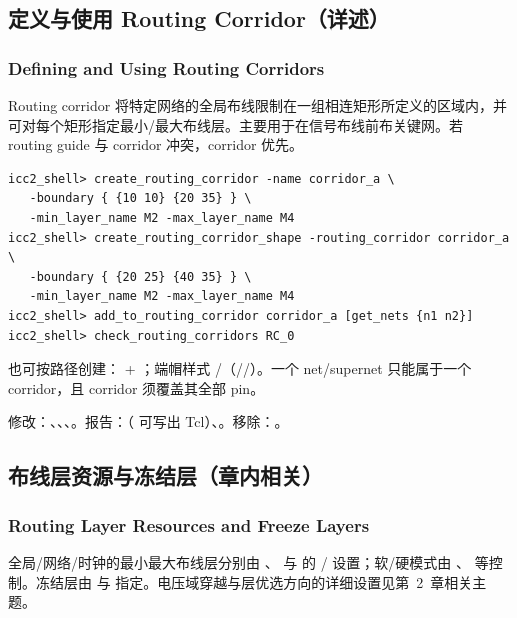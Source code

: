 
\subsection{定义与使用 Routing Corridor（详述）}
\subsubsection*{Defining and Using Routing Corridors}

Routing corridor 将特定网络的全局布线限制在一组相连矩形所定义的区域内，并可对每个矩形指定最小/最大布线层。主要用于在信号布线前布关键网。若 routing guide 与 corridor 冲突，corridor 优先。

\begin{lstlisting}
icc2_shell> create_routing_corridor -name corridor_a \
   -boundary { {10 10} {20 35} } \
   -min_layer_name M2 -max_layer_name M4
icc2_shell> create_routing_corridor_shape -routing_corridor corridor_a \
   -boundary { {20 25} {40 35} } \
   -min_layer_name M2 -max_layer_name M4
icc2_shell> add_to_routing_corridor corridor_a [get_nets {n1 n2}]
icc2_shell> check_routing_corridors RC_0
\end{lstlisting}

也可按路径创建：\opt{-path} + \opt{-width}；端帽样式 \opt{-start\_endcap}/（//）。一个 net/supernet 只能属于一个 corridor，且 corridor 须覆盖其全部 pin。

修改：、、、。报告：（ 可写出 Tcl）、。移除：。

\subsection{布线层资源与冻结层（章内相关）}
\subsubsection*{Routing Layer Resources and Freeze Layers}

全局/网络/时钟的最小最大布线层分别由 、 与  的 / 设置；软/硬模式由 、 等控制。冻结层由  与  指定。电压域穿越与层优选方向的详细设置见第~2~章相关主题。

